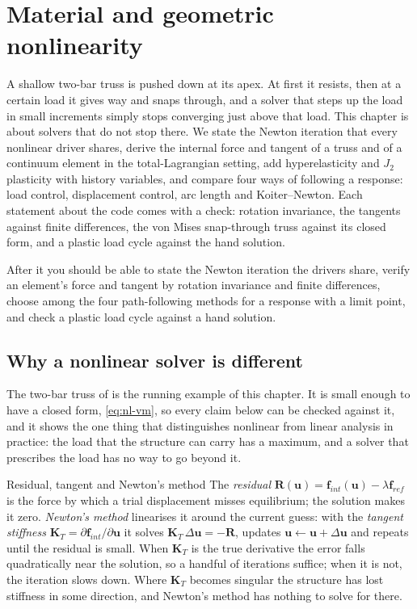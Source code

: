 \chapter{Material and geometric nonlinearity}\label{ch:nonlin}

\begin{tcolorbox}[colback=hpale,colframe=hnavy!60,coltitle=white,colbacktitle=hnavy!85,title={In this chapter}]
A shallow two-bar truss is pushed down at its apex. At first it resists, then at a certain load it gives way and snaps through, and a solver that steps up the load in small increments simply stops converging just above that load. This chapter is about solvers that do not stop there. We state the Newton iteration that every nonlinear driver shares, derive the internal force and tangent of a truss and of a continuum element in the total-Lagrangian setting, add hyperelasticity and $J_2$ plasticity with history variables, and compare four ways of following a response: load control, displacement control, arc length and Koiter--Newton. Each statement about the code comes with a check: rotation invariance, the tangents against finite differences, the von Mises snap-through truss against its closed form, and a plastic load cycle against the hand solution.\par\smallskip
After it you should be able to state the Newton iteration the drivers share, verify an element's force and tangent by rotation invariance and finite differences, choose among the four path-following methods for a response with a limit point, and check a plastic load cycle against a hand solution.
\end{tcolorbox}

\section{Why a nonlinear solver is different}\label{sec:nl-why}

The two-bar truss of  is the running example of this chapter. It is small enough to have a closed form, \eqref{eq:nl-vm}, so every claim below can be checked against it, and it shows the one thing that distinguishes nonlinear from linear analysis in practice: the load that the structure can carry has a maximum, and a solver that prescribes the load has no way to go beyond it.

\begin{sidenote}{Residual, tangent and Newton's method}
The \emph{residual} $\bm R(\bm u)=\bm f_{int}(\bm u)-\lambda\bm f_{ref}$ is the force by which a trial displacement misses equilibrium; the solution makes it zero. \emph{Newton's method} linearises it around the current guess: with the \emph{tangent stiffness} $\bm K_T=\partial\bm f_{int}/\partial\bm u$ it solves $\bm K_T\,\Delta\bm u=-\bm R$, updates $\bm u\leftarrow\bm u+\Delta\bm u$ and repeats until the residual is small. When $\bm K_T$ is the true derivative the error falls quadratically near the solution, so a handful of iterations suffice; when it is not, the iteration slows down. Where $\bm K_T$ becomes singular the structure has lost stiffness in some direction, and Newton's method has nothing to solve for there.
\end{sidenote}


